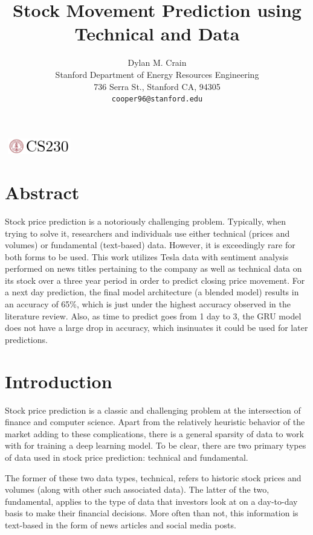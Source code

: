 \documentclass{article}
\title{Stock Movement Prediction using Technical and  Data}
\author{
  Dylan M. Crain\\
  Stanford Department of Energy Resources Engineering\\
  736 Serra St., Stanford CA, 94305 \\
  \texttt{cooper96@stanford.edu} \\
}
\begin{document}
\begin{center}
\includegraphics[width=3cm, height=0.7cm]{CS230}
\end{center}

\maketitle

\section{Abstract}

Stock price prediction is a notoriously challenging problem. Typically, when
trying to solve it, researchers and individuals use either technical 
(prices and volumes) or fundamental (text-based) data. However, it is exceedingly
rare for both forms to be used. This work utilizes Tesla data with sentiment analysis
performed on news titles pertaining to the company as well as technical data on its stock
over a three year period in order to predict closing price movement. For a next day
prediction, the final model architecture (a blended model) results in an
accuracy of 65\%, which is just under the highest accuracy observed in the
literature review. Also, as time to predict goes from 1 day to 3, the GRU model
does not have a large drop in accuracy, which insinuates it could be used for
later predictions.

\section{Introduction}

Stock price prediction is a classic and challenging problem at the intersection
of finance and computer science. Apart from the relatively heuristic behavior of
the market adding to these complications, there is a general sparsity of
data to work with for training a deep learning model. To be clear, there are
two primary types of data used in stock price prediction: technical and fundamental.

The former of these two data types, technical, refers to historic stock prices
and volumes (along with other such associated data). The latter of the two,
fundamental, applies to the type of data that investors look at on a
day-to-day basis to make their financial decisions. More often than not, this
information is text-based in the form of news articles and social media posts.
\end{document}
